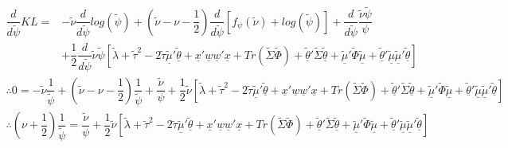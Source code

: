 \documentclass[fleqn]{minimal}
\begin{document}
\begin{align*}
  \dfrac{d}{d\tilde{\psi}}KL = &
  -
  \tilde{\nu}
  \dfrac{d}{d\tilde{\psi}}
  log \left(
    \tilde{\psi}
  \right)
  +
  \left(
    \tilde{\nu}
    -\nu
    -\dfrac{1}{2}
  \right)
  \dfrac{d}{d\tilde{\psi}}
  \left[
    f_{\psi} \left( \tilde{\nu} \right)
    + log\left( \tilde{\psi} \right)
  \right]
  +
  \dfrac{d}{d\tilde{\psi}}
  \dfrac{\tilde{\nu} \tilde{\psi}}{\psi} \\
  &
  + \dfrac{1}{2}
  \dfrac{d}{d\tilde{\psi}}
  \tilde{\nu} \tilde{\psi}
  \left[
    \tilde{\lambda} + \tilde{\tau}^2
    - 2\tilde{\tau}\underline{\tilde{\mu}}'\underline{\tilde{\theta}}
    + \underline{x}'\underline{w}\underline{w}'\underline{x}
    + Tr \left( \tilde{\Sigma}\tilde{\Phi}\right)
    + \underline{\tilde{\theta}}'\tilde{\Sigma}\underline{\tilde{\theta}}
    + \underline{\tilde{\mu}}'\tilde{\Phi}\underline{\tilde{\mu}}
    + \underline{\tilde{\theta}}'\underline{\tilde{\mu}}\underline{\tilde{\mu}}'\underline{\tilde{\theta}}
  \right]
\end{align*}
\begin{align*}
  \therefore
  0 =
  -
  \tilde{\nu}
  \dfrac{1}{\tilde{\psi}}
  +
  \left(
    \tilde{\nu}
    -\nu
    -\dfrac{1}{2}
  \right)
  \dfrac{1}{\tilde{\psi}}
  +
  \dfrac{\tilde{\nu}}{\psi}
  + \dfrac{1}{2}
  \tilde{\nu}
  \left[
    \tilde{\lambda} + \tilde{\tau}^2
    - 2\tilde{\tau}\underline{\tilde{\mu}}'\underline{\tilde{\theta}}
    + \underline{x}'\underline{w}\underline{w}'\underline{x}
    + Tr \left( \tilde{\Sigma}\tilde{\Phi}\right)
    + \underline{\tilde{\theta}}'\tilde{\Sigma}\underline{\tilde{\theta}}
    + \underline{\tilde{\mu}}'\tilde{\Phi}\underline{\tilde{\mu}}
    + \underline{\tilde{\theta}}'\underline{\tilde{\mu}}\underline{\tilde{\mu}}'\underline{\tilde{\theta}}
  \right]
\end{align*}
\begin{align*}
  \therefore
  \left(
    \nu
    +\dfrac{1}{2}
  \right)
  \dfrac{1}{\tilde{\psi}}
  =
  \dfrac{\tilde{\nu}}{\psi}
  + \dfrac{1}{2}
  \tilde{\nu}
  \left[
    \tilde{\lambda} + \tilde{\tau}^2
    - 2\tilde{\tau}\underline{\tilde{\mu}}'\underline{\tilde{\theta}}
    + \underline{x}'\underline{w}\underline{w}'\underline{x}
    + Tr \left( \tilde{\Sigma}\tilde{\Phi}\right)
    + \underline{\tilde{\theta}}'\tilde{\Sigma}\underline{\tilde{\theta}}
    + \underline{\tilde{\mu}}'\tilde{\Phi}\underline{\tilde{\mu}}
    + \underline{\tilde{\theta}}'\underline{\tilde{\mu}}\underline{\tilde{\mu}}'\underline{\tilde{\theta}}
  \right]
\end{align*}
\end{document}

